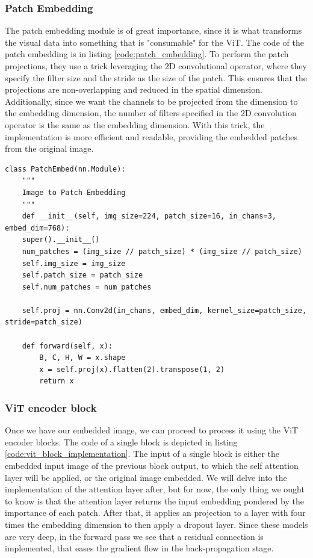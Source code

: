 \subsubsection{Patch Embedding}
The patch embedding module is of great importance, since it is what transforms the visual data into something that is "consumable" for the ViT. The code of the patch embedding is in listing \ref{code:patch_embedding}. To perform the patch projections, they use a trick leveraging the 2D convolutional operator, where they specify the filter size and the stride as the size of the patch. This ensures that the projections are non-overlapping and reduced in the spatial dimension. Additionally, since we want the channels to be projected from the  dimension to the embedding dimension, the number of filters specified in the 2D convolution operator is the same as the embedding dimension. With this trick, the implementation is more efficient and readable, providing the embedded patches from the original image.

\begin{lstlisting}[caption={Patch Embedding module}, label={code:patch_embedding}]
class PatchEmbed(nn.Module):
	""" 
	Image to Patch Embedding
	"""
	def __init__(self, img_size=224, patch_size=16, in_chans=3, embed_dim=768):
	super().__init__()
	num_patches = (img_size // patch_size) * (img_size // patch_size)
	self.img_size = img_size
	self.patch_size = patch_size
	self.num_patches = num_patches
	
	self.proj = nn.Conv2d(in_chans, embed_dim, kernel_size=patch_size, stride=patch_size)
	
	def forward(self, x):
		B, C, H, W = x.shape
		x = self.proj(x).flatten(2).transpose(1, 2)
		return x
\end{lstlisting}

\subsubsection{ViT encoder block}
Once we have our embedded image, we can proceed to process it using the ViT encoder blocks. The code of a single block is depicted in listing \ref{code:vit_block_implementation}. The input of a single block is either the embedded input image of the previous block output, to which the self attention layer will be applied, or the original image embedded. We will delve into the implementation of the attention layer after, but for now, the only thing we ought to know is that the attention layer returns the input embedding pondered by the importance of each patch. After that, it applies an projection to a layer with four times the embedding dimension to then apply a dropout layer. Since these models are very deep, in the forward pass we see that a residual connection \cite{he2015deep} is implemented, that eases the gradient flow in the back-propagation stage.

